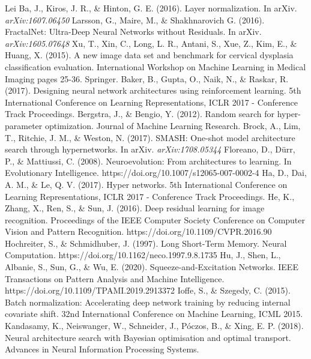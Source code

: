 \documentclass[conference]{IEEEtran}
\begin{document}
\begin{thebibliography}{00}
 Lei Ba, J., Kiros, J. R., \& Hinton, G. E. (2016). Layer normalization. In arXiv. \textit{arXiv:1607.06450}
 Larsson, G., Maire, M., \& Shakhnarovich G. (2016). FractalNet: Ultra-Deep Neural Networks without Residuals. In arXiv. \textit{arXiv:1605.07648}
 Xu, T., Xin, C., Long, L. R., Antani, S., Xue, Z., Kim, E., \& Huang, X. (2015). A new image data set and benchmark for cervical dysplasia classification evaluation. International Workshop on Machine Learning in Medical Imaging pages 25-36. Springer.
 Baker, B., Gupta, O., Naik, N., \& Raskar, R. (2017). Designing neural network architectures using reinforcement learning. 5th International Conference on Learning Representations, ICLR 2017 - Conference Track Proceedings.
 Bergstra, J., \& Bengio, Y. (2012). Random search for hyper-parameter optimization. Journal of Machine Learning Research.
 Brock, A., Lim, T., Ritchie, J. M., \& Weston, N. (2017). SMASH: One-shot model architecture search through hypernetworks. In arXiv. \textit{arXiv:1708.05344}
 Floreano, D., Dürr, P., \& Mattiussi, C. (2008). Neuroevolution: From architectures to learning. In Evolutionary Intelligence. https://doi.org/10.1007/s12065-007-0002-4
 Ha, D., Dai, A. M., \& Le, Q. V. (2017). Hyper networks. 5th International Conference on Learning Representations, ICLR 2017 - Conference Track Proceedings.
 He, K., Zhang, X., Ren, S., \& Sun, J. (2016). Deep residual learning for image recognition. Proceedings of the IEEE Computer Society Conference on Computer Vision and Pattern Recognition. https://doi.org/10.1109/CVPR.2016.90
 Hochreiter, S., \& Schmidhuber, J. (1997). Long Short-Term Memory. Neural Computation. https://doi.org/10.1162/neco.1997.9.8.1735
 Hu, J., Shen, L., Albanie, S., Sun, G., \& Wu, E. (2020). Squeeze-and-Excitation Networks. IEEE Transactions on Pattern Analysis and Machine Intelligence. https://doi.org/10.1109/TPAMI.2019.2913372
 Ioffe, S., \& Szegedy, C. (2015). Batch normalization: Accelerating deep network training by reducing internal covariate shift. 32nd International Conference on Machine Learning, ICML 2015.
 Kandasamy, K., Neiswanger, W., Schneider, J., Póczos, B., \& Xing, E. P. (2018). Neural architecture search with Bayesian optimisation and optimal transport. Advances in Neural Information Processing Systems.

\end{thebibliography}
\end{document}
